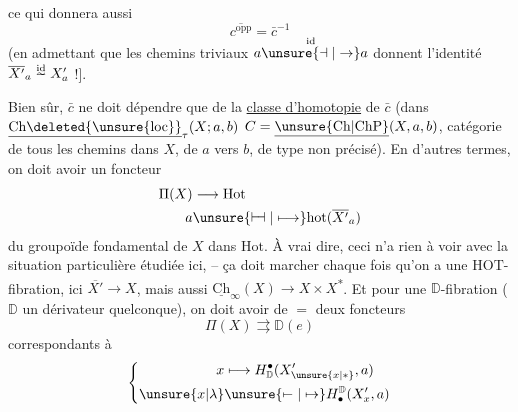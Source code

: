 ce qui donnera aussi
\[
\overline{c^{\mathrm{opp}}}=\bar c^{-1}
\]
(en admettant que les chemins triviaux $a\overset{\mathrm{id}}{\unsure{\dashv|\to}}a$
donnent l'identité $\overline{X'}_a\overset{\substack{\mathrm{id}\\[-2pt]\sim}}{\relbar}X'_a$ !]. 

Bien sûr, $\bar c$ ne doit dépendre que de la
\uline{classe d'homotopie} de $\bar c$ (dans $\underline{\mathrm{Ch}\deleted{\unsure{\mathrm{loc}}}}_{\tau}(X;a,b)$ 
   $C=\underline{\unsure{\mathrm{Ch}|\mathrm{ChP}}}(X,a,b)$, catégorie de
tous les chemins dans $X$, de $a$ vers $b$, de
type non précisé). En d'autres termes, on
doit avoir un foncteur
\[
\begin{aligned}
\Pi(X)&\longrightarrow\mathrm{Hot}\\
a&\unsure{\mathrel{\vdash\!\dashv}|\longmapsto}\mathrm{hot}(\overline{X'}_a)
\end{aligned}
\]
du groupoïde fondamental de $X$ dans $\mathrm{Hot}$.
 À vrai dire, ceci n'a rien à
voir avec la situation particulière étudiée
ici, -- ça doit marcher chaque fois qu'on
a une $\mathrm{HOT}$-fibration, ici $\overline{X'}\longrightarrow X$,
mais aussi $\underline{\mathrm{Ch}}_{\infty}(X)\longrightarrow X\times X$\textsuperscript{*}. Et
pour une $\mathbb D$-fibration  ($\mathbb D$ un dérivateur
quelconque),  on doit avoir de $=$ deux foncteurs
\[
\Pi(X)\rightrightarrows\mathbb D(e)
\]
correspondants à
\[
\left\{\begin{aligned}
x&\longmapsto H^{\bullet}_{\mathbb D}(X'_{\unsure{x|*}},a)\\
\unsure{x|\lambda}&\unsure{\mapstochar\relbar|\mapsto}H^{\mathbb D}_{\bullet}(X'_x,a)
\end{aligned}\right.
\]
